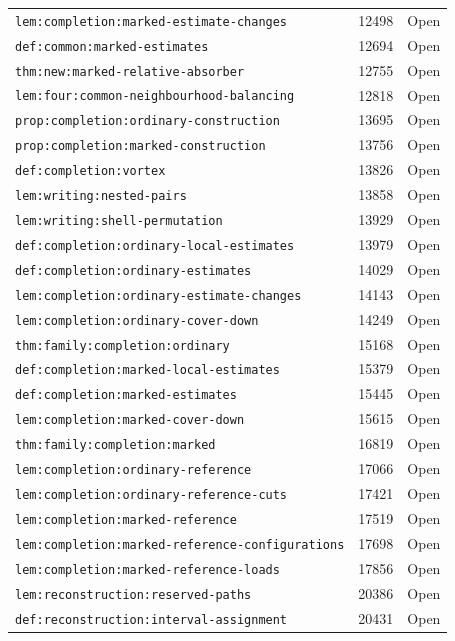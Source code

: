 \begin{longtable}{p{}r >{\raggedright\arraybackslash}p{}}
\nolinkurl{lem:completion:marked-estimate-changes} & 12498 & Open \\
\nolinkurl{def:common:marked-estimates} & 12694 & Open \\
\nolinkurl{thm:new:marked-relative-absorber} & 12755 & Open \\
\nolinkurl{lem:four:common-neighbourhood-balancing} & 12818 & Open \\
\nolinkurl{prop:completion:ordinary-construction} & 13695 & Open \\
\nolinkurl{prop:completion:marked-construction} & 13756 & Open \\
\nolinkurl{def:completion:vortex} & 13826 & Open \\
\nolinkurl{lem:writing:nested-pairs} & 13858 & Open \\
\nolinkurl{lem:writing:shell-permutation} & 13929 & Open \\
\nolinkurl{def:completion:ordinary-local-estimates} & 13979 & Open \\
\nolinkurl{def:completion:ordinary-estimates} & 14029 & Open \\
\nolinkurl{lem:completion:ordinary-estimate-changes} & 14143 & Open \\
\nolinkurl{lem:completion:ordinary-cover-down} & 14249 & Open \\
\nolinkurl{thm:family:completion:ordinary} & 15168 & Open \\
\nolinkurl{def:completion:marked-local-estimates} & 15379 & Open \\
\nolinkurl{def:completion:marked-estimates} & 15445 & Open \\
\nolinkurl{lem:completion:marked-cover-down} & 15615 & Open \\
\nolinkurl{thm:family:completion:marked} & 16819 & Open \\
\nolinkurl{lem:completion:ordinary-reference} & 17066 & Open \\
\nolinkurl{lem:completion:ordinary-reference-cuts} & 17421 & Open \\
\nolinkurl{lem:completion:marked-reference} & 17519 & Open \\
\nolinkurl{lem:completion:marked-reference-configurations} & 17698 & Open \\
\nolinkurl{lem:completion:marked-reference-loads} & 17856 & Open \\
\nolinkurl{lem:reconstruction:reserved-paths} & 20386 & Open \\
\nolinkurl{def:reconstruction:interval-assignment} & 20431 & Open \\

\end{longtable}
